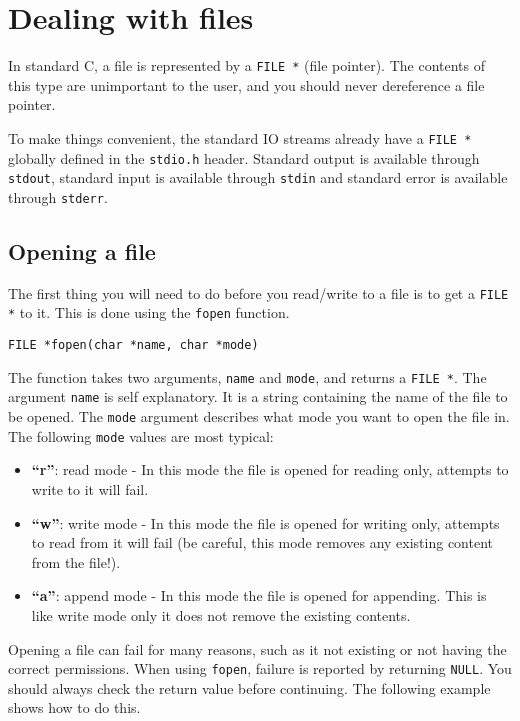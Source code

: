 \chapter{Dealing with files}

In standard C, a file is represented by a \texttt{FILE *} (file pointer).
The contents of this type are unimportant to the user, and you should never dereference a file pointer.

To make things convenient, the standard IO streams already have a \texttt{FILE *} globally defined in the \texttt{stdio.h} header.
Standard output is available through \texttt{stdout}, standard input is available through \texttt{stdin} and standard error is available through \texttt{stderr}.

\section{Opening a file}

The first thing you will need to do before you read/write to a file is to get a \texttt{FILE *} to it.
This is done using the \texttt{fopen} function.

\begin{lstlisting}[numbers=none,frame=none]
FILE *fopen(char *name, char *mode)
\end{lstlisting}

The function takes two arguments, \texttt{name} and \texttt{mode}, and returns a \texttt{FILE *}.
The argument \texttt{name} is self explanatory. It is a string containing the name of the file to be opened.
The \texttt{mode} argument describes what mode you want to open the file in.
The following \texttt{mode} values are most typical:

\begin{itemize}
  \item{\textbf{``r''}:} read mode - In this mode the file is opened for reading only, attempts to write to it will fail.
  \item{\textbf{``w''}:} write mode - In this mode the file is opened for writing only, attempts to read from it will fail (be careful, this mode removes any existing content from the file!).
  \item{\textbf{``a''}:} append mode - In this mode the file is opened for appending. This is like write mode only it does not remove the existing contents.
\end{itemize}

Opening a file can fail for many reasons, such as it not existing or not having the correct permissions.
When using \texttt{fopen}, failure is reported by returning \texttt{NULL}.
You should always check the return value before continuing.
The following example shows how to do this.

